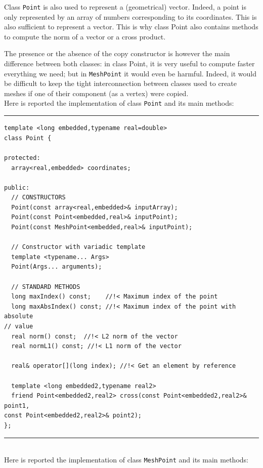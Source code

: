 Class \verb|Point| is also used to represent a (geometrical) vector. Indeed, a point is only represented by an array of numbers corresponding to its coordinates. This is also sufficient to represent a vector. This is why class Point also contains methods to compute the norm of a vector or a cross product. 

The presence or the absence of the copy constructor is however the main difference between both classes: in class Point, it is very useful to compute faster everything we need; but in \verb|MeshPoint| it would even be harmful. Indeed, it would be difficult to keep the tight interconnection between classes used to create meshes if one of their component (as a vertex) were copied. \\

Here is reported the implementation of class \verb|Point| and its main methods: \\


\noindent\rule{16cm}{1pt}
\begin{lstlisting}[caption=File \texttt{Point.h}]
template <long embedded,typename real=double>
class Point {

protected:
  array<real,embedded> coordinates;

public:
  // CONSTRUCTORS
  Point(const array<real,embedded>& inputArray);
  Point(const Point<embedded,real>& inputPoint);
  Point(const MeshPoint<embedded,real>& inputPoint);

  // Constructor with variadic template
  template <typename... Args>
  Point(Args... arguments);

  // STANDARD METHODS
  long maxIndex() const;	//!< Maximum index of the point
  long maxAbsIndex() const;	//!< Maximum index of the point with absolute 
// value
  real norm() const;  //!< L2 norm of the vector
  real normL1() const; //!< L1 norm of the vector

  real& operator[](long index);	//!< Get an element by reference

  template <long embedded2,typename real2>
  friend Point<embedded2,real2> cross(const Point<embedded2,real2>& point1, 
const Point<embedded2,real2>& point2);
};
\end{lstlisting}

\noindent\rule{16cm}{1pt}\\

Here is reported the implementation of class \verb|MeshPoint| and its main methods:\\

